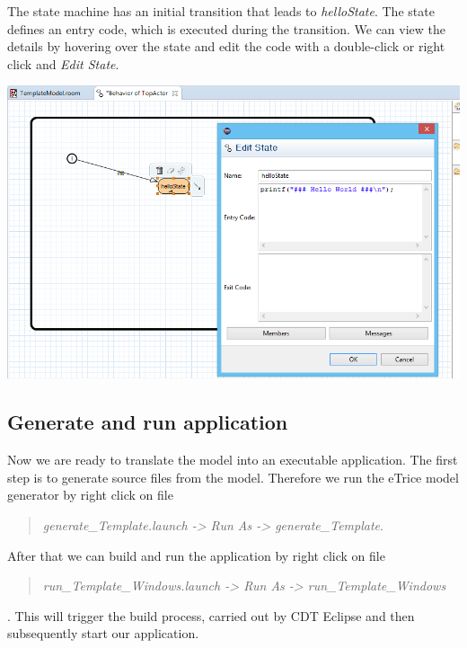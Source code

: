 The state machine has an initial transition that leads to \emph{helloState}. The state defines an entry code, which is executed during the transition. We can view the details by hovering over the state and edit the code with a double-click or right click and \emph{Edit State}.

\includegraphics[width=\textwidth]{images/013-hello-fsm.png}

\subsection{Generate and run application}

Now we are ready to translate the model into an executable application. The first step is to generate source files from the model. Therefore we run the eTrice model generator by right click on file \begin{quote}
	\emph{generate\_Template.launch -> Run As -> generate\_Template}.
\end{quote}
After that we can build and run the application by right click on file
\begin{quote}
	 \emph{run\_Template\_Windows.launch -> Run As -> run\_Template\_Windows}
\end{quote}.
This will trigger the build process, carried out by CDT Eclipse and then subsequently start our application.

